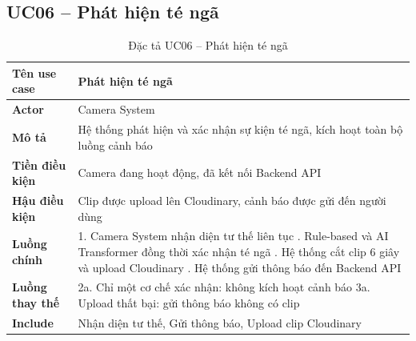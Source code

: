 \subsection*{UC06 -- Phát hiện té ngã}
\begin{table}[H]
        \captionsetup{justification=raggedright, singlelinecheck=false}
        \caption{Đặc tả UC06 -- Phát hiện té ngã}
\centering
\begin{tabular}{|p{3.5cm}|p{10cm}|}
\hline
\textbf{Tên use case} & Phát hiện té ngã \\
\hline
\textbf{Actor} & Camera System \\
\hline
\textbf{Mô tả} & Hệ thống phát hiện và xác nhận sự kiện
  té ngã, kích hoạt toàn bộ luồng cảnh báo \\
\hline
\textbf{Tiền điều kiện} & Camera đang hoạt động, đã kết nối
  Backend API \\
\hline
\textbf{Hậu điều kiện} & Clip được upload lên Cloudinary,
  cảnh báo được gửi đến người dùng \\
\hline
\textbf{Luồng chính} &
  1. Camera System nhận diện tư thế liên tục \newline
  2. Rule-based và AI Transformer đồng thời xác nhận
     té ngã \newline
  3. Hệ thống cắt clip 6 giây và upload Cloudinary \newline
  4. Hệ thống gửi thông báo đến Backend API \\
\hline
\textbf{Luồng thay thế} &
  2a. Chỉ một cơ chế xác nhận: không kích hoạt
  cảnh báo \newline
  3a. Upload thất bại: gửi thông báo không có clip \\
\hline
\textbf{Include} & Nhận diện tư thế, Gửi thông báo,
  Upload clip Cloudinary \\
\hline
\end{tabular}

\end{table}

